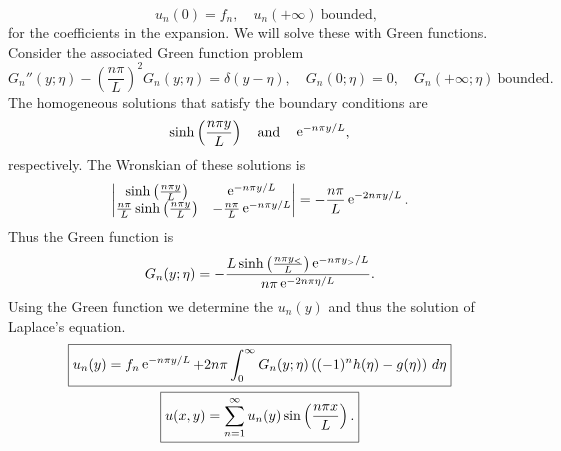 {\begin{Solution}
\[  \quad u_n(0) = f_n, \quad u_n(+\infty)\ \mathrm{bounded},
  \]
  for the coefficients in the expansion.  We will solve these with Green 
  functions.  Consider the associated Green function problem
  \[
  G_n''(y; \eta) - \left( \frac{n \pi}{L} \right)^2 G_n(y; \eta) = 
  \delta(y - \eta), \quad
  G_n(0; \eta) = 0, \quad G_n(+\infty; \eta)\ \mathrm{bounded}.
  \]
  The homogeneous solutions that satisfy the boundary conditions are
  \[
  \sinh \left( \frac{n \pi y}{L} \right) \quad \mathrm{and} \quad
  \mathop{\mathrm{e}}\nolimits^{-n \pi y / L},
  \]
  respectively.  The Wronskian of these solutions is
  \[
  \begin{vmatrix}
    \sinh \left( \frac{n \pi y}{L} \right) & \mathop{\mathrm{e}}\nolimits^{-n \pi y / L} \\
    \frac{n \pi}{L} \sinh \left( \frac{n \pi y}{L} \right) 
    & - \frac{n \pi}{L} \mathop{\mathrm{e}}\nolimits^{-n \pi y / L} 
  \end{vmatrix}
  =
  - \frac{n \pi}{L} \mathop{\mathrm{e}}\nolimits^{- 2 n \pi y / L}.
  \]
  Thus the Green function is
  \[
  G_n(y; \eta) = - \frac{ L \sinh \left( \frac{n \pi y_<}{L} \right)
    \mathop{\mathrm{e}}\nolimits^{- n \pi y_> / L} }{ n \pi \mathop{\mathrm{e}}\nolimits^{-2 n \pi \eta / L} }.
  \]
  Using the Green function we determine the $u_n(y)$ and thus the solution 
  of Laplace's equation.
  \begin{gather*}
    \boxed{
      u_n(y) = f_n \mathop{\mathrm{e}}\nolimits^{- n \pi y / L} + 2 n \pi \int_0^\infty G_n(y; \eta)
      \left( (-1)^n h(\eta) - g(\eta) \right) \,d\eta
      } \\
    \boxed{
      u(x, y) = \sum_{n = 1}^\infty u_n(y) \sin \left( \frac{n \pi x}{L} \right).
      }
  \end{gather*}
\end{Solution}










\raggedbottom
}
